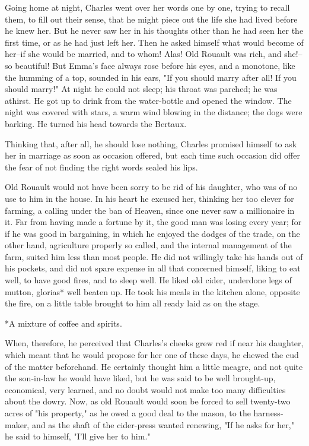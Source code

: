 \documentclass[11pt,twocolumn]{ltugboat}
\begin{document}
Going home at night, Charles went over her words one by one, trying to
recall them, to fill out their sense, that he might piece out the life
she had lived before he knew her. But he never saw her in his thoughts
other than he had seen her the first time, or as he had just left her.
Then he asked himself what would become of her--if she would be married,
and to whom! Alas! Old Rouault was rich, and she!--so beautiful! But
Emma's face always rose before his eyes, and a monotone, like the
humming of a top, sounded in his ears, "If you should marry after
all! If you should marry!" At night he could not sleep; his throat was
parched; he was athirst. He got up to drink from the water-bottle and
opened the window. The night was covered with stars, a warm wind blowing
in the distance; the dogs were barking. He turned his head towards the
Bertaux.

Thinking that, after all, he should lose nothing, Charles promised
himself to ask her in marriage as soon as occasion offered, but each
time such occasion did offer the fear of not finding the right words
sealed his lips.

Old Rouault would not have been sorry to be rid of his daughter, who was
of no use to him in the house. In his heart he excused her, thinking
her too clever for farming, a calling under the ban of Heaven, since one
never saw a millionaire in it. Far from having made a fortune by it,
the good man was losing every year; for if he was good in bargaining, in
which he enjoyed the dodges of the trade, on the other hand, agriculture
properly so called, and the internal management of the farm, suited him
less than most people. He did not willingly take his hands out of his
pockets, and did not spare expense in all that concerned himself, liking
to eat well, to have good fires, and to sleep well. He liked old cider,
underdone legs of mutton, glorias* well beaten up. He took his meals in
the kitchen alone, opposite the fire, on a little table brought to him
all ready laid as on the stage.

     *A mixture of coffee and spirits.

When, therefore, he perceived that Charles's cheeks grew red if near his
daughter, which meant that he would propose for her one of these days,
he chewed the cud of the matter beforehand. He certainly thought him a
little meagre, and not quite the son-in-law he would have liked, but he
was said to be well brought-up, economical, very learned, and no doubt
would not make too many difficulties about the dowry. Now, as old
Rouault would soon be forced to sell twenty-two acres of "his property,"
as he owed a good deal to the mason, to the harness-maker, and as the
shaft of the cider-press wanted renewing, "If he asks for her," he said
to himself, "I'll give her to him."
\end{document}
